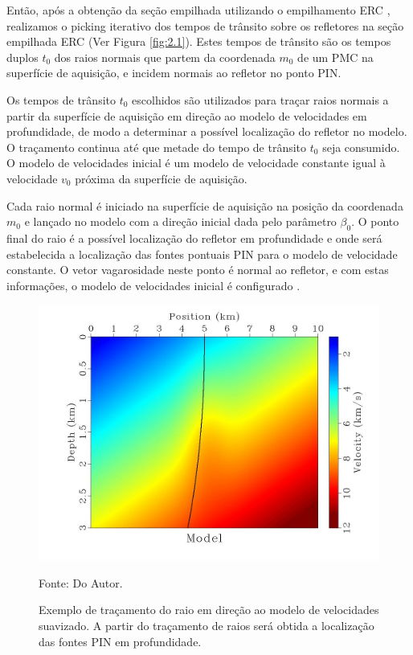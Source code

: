 Então, após a obtenção da seção empilhada utilizando o empilhamento ERC \cite{relatorio}, realizamos
o picking iterativo dos tempos de trânsito sobre os refletores na seção empilhada ERC (Ver Figura \ref{fig:2.1}).
Estes tempos de trânsito são os tempos duplos $t_0$ dos raios normais que partem da coordenada $m_0$
de um PMC na superfície de aquisição, e incidem normais ao refletor no ponto PIN.

Os tempos de trânsito $t_0$ escolhidos são utilizados para traçar raios normais
a partir da superfície de aquisição em direção ao modelo de velocidades
em profundidade,
de modo a determinar a possível localização do refletor no modelo.
O traçamento continua até que metade do tempo de trânsito $t_0$ seja consumido.
O modelo de velocidades inicial é um modelo de velocidade constante igual à velocidade $v_0$
próxima da superfície de aquisição.

Cada raio normal é iniciado na superfície de aquisição na posição da coordenada $m_0$ e lançado no modelo 
com a direção inicial dada pelo parâmetro $\beta_0$.
O ponto final do raio é a possível localização do refletor em profundidade
e onde será estabelecida a localização das fontes pontuais PIN para o modelo de velocidade
constante. O vetor vagarosidade neste ponto é
normal ao refletor, e com estas informações, o modelo de velocidades inicial é configurado \cite{niptomo}.

\begin{figure}[H]
\caption{Exemplo de traçamento do raio em direção ao modelo de velocidades suavizado.
A partir do traçamento de raios será obtida a localização das fontes PIN em profundidade.}
\begin{center}
\includegraphics[scale=0.3]{images/raiomodelo.jpg}
\vspace{-0.3cm}
\end{center}
\begin{center}
 Fonte: Do Autor.
\end{center}
\label{fig:2.2}
\end{figure}

